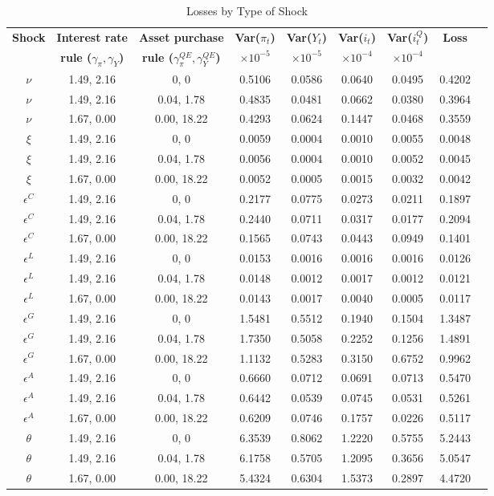 \documentclass[12pt]{article}
\begin{document}
\begin{table}[ht]
\centering
\caption{Losses by Type of Shock}
\label{tab:simulation_results}
\begin{tabular}{ccccccccc}
\hline
\textbf{Shock} & \textbf{Interest rate} & \textbf{Asset purchase} & \textbf{Var(\(\pi_t\))} & \textbf{Var(\(Y_t\))} & \textbf{Var(\(i_t\))} & \textbf{Var(\(i_t^Q\))} & \textbf{Loss} \\
& \textbf{rule (\(\gamma_{\pi}, \gamma_{Y}\))} & \textbf{rule (\(\gamma_{\pi}^{QE}, \gamma_{Y}^{QE}\))} & $\times 10^{-5}$ & $\times 10^{-5}$ & $\times 10^{-4}$ & $\times 10^{-4}$ & \\
\hline
$\nu$ & 1.49, 2.16 & 0, 0 & 0.5106 & 0.0586 & 0.0640 & 0.0495 & 0.4202 \\
$\nu$ & 1.49, 2.16 & 0.04, 1.78 & 0.4835 & 0.0481 & 0.0662 & 0.0380 & 0.3964 \\
$\nu$ & 1.67, 0.00 & 0.00, 18.22 & 0.4293 & 0.0624 & 0.1447 & 0.0468 & 0.3559 \\
$\xi$ & 1.49, 2.16 & 0, 0 & 0.0059 & 0.0004 & 0.0010 & 0.0055 & 0.0048 \\
$\xi$ & 1.49, 2.16 & 0.04, 1.78 & 0.0056 & 0.0004 & 0.0010 & 0.0052 & 0.0045 \\
$\xi$ & 1.67, 0.00 & 0.00, 18.22 & 0.0052 & 0.0005 & 0.0015 & 0.0032 & 0.0042 \\
$\epsilon^C$ & 1.49, 2.16 & 0, 0 & 0.2177 & 0.0775 & 0.0273 & 0.0211 & 0.1897 \\
$\epsilon^C$ & 1.49, 2.16 & 0.04, 1.78 & 0.2440 & 0.0711 & 0.0317 & 0.0177 & 0.2094 \\
$\epsilon^C$ & 1.67, 0.00 & 0.00, 18.22 & 0.1565 & 0.0743 & 0.0443 & 0.0949 & 0.1401 \\
$\epsilon^L$ & 1.49, 2.16 & 0, 0 & 0.0153 & 0.0016 & 0.0016 & 0.0016 & 0.0126 \\
$\epsilon^L$ & 1.49, 2.16 & 0.04, 1.78 & 0.0148 & 0.0012 & 0.0017 & 0.0012 & 0.0121 \\
$\epsilon^L$ & 1.67, 0.00 & 0.00, 18.22 & 0.0143 & 0.0017 & 0.0040 & 0.0005 & 0.0117 \\
$\epsilon^G$ & 1.49, 2.16 & 0, 0 & 1.5481 & 0.5512 & 0.1940 & 0.1504 & 1.3487 \\
$\epsilon^G$ & 1.49, 2.16 & 0.04, 1.78 & 1.7350 & 0.5058 & 0.2252 & 0.1256 & 1.4891 \\
$\epsilon^G$ & 1.67, 0.00 & 0.00, 18.22 & 1.1132 & 0.5283 & 0.3150 & 0.6752 & 0.9962 \\
$\epsilon^A$ & 1.49, 2.16 & 0, 0 & 0.6660 & 0.0712 & 0.0691 & 0.0713 & 0.5470 \\
$\epsilon^A$ & 1.49, 2.16 & 0.04, 1.78 & 0.6442 & 0.0539 & 0.0745 & 0.0531 & 0.5261 \\
$\epsilon^A$ & 1.67, 0.00 & 0.00, 18.22 & 0.6209 & 0.0746 & 0.1757 & 0.0226 & 0.5117 \\
$\theta$ & 1.49, 2.16 & 0, 0 & 6.3539 & 0.8062 & 1.2220 & 0.5755 & 5.2443 \\
$\theta$ & 1.49, 2.16 & 0.04, 1.78 & 6.1758 & 0.5705 & 1.2095 & 0.3656 & 5.0547 \\
$\theta$ & 1.67, 0.00 & 0.00, 18.22 & 5.4324 & 0.6304 & 1.5373 & 0.2897 & 4.4720 \\
\hline
\end{tabular}
\end{table}
\end{document}
